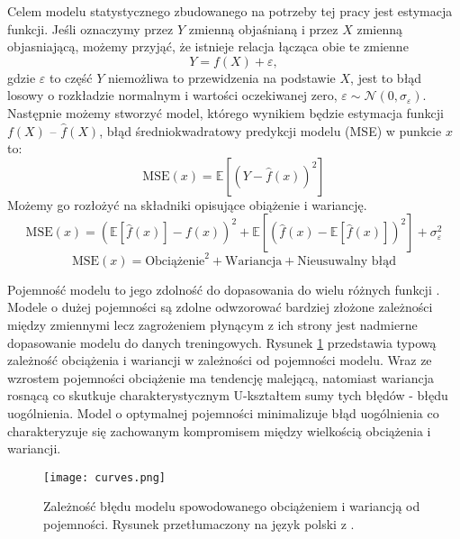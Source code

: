 \documentclass[11pt]{book}
\theoremstyle{definition}
\begin{document}
Celem modelu statystycznego zbudowanego na potrzeby tej pracy jest estymacja funkcji. Jeśli oznaczymy przez $Y$ zmienną objaśnianą i przez $X$ zmienną objasniającą, możemy przyjąć, że istnieje relacja łącząca obie te zmienne
%
\begin{equation}
 Y = f(X) + \varepsilon,
\end{equation}
%
gdzie $\varepsilon$ to część $Y$ niemożliwa to przewidzenia na podstawie $X$, jest to błąd losowy o rozkładzie normalnym i wartości oczekiwanej zero,  $\varepsilon \sim \mathcal{N}(0, \sigma_{\varepsilon})$. Następnie możemy stworzyć model, którego wynikiem będzie estymacja funkcji $f(X)$ -- $\hat{f}(X)$, błąd średniokwadratowy predykcji modelu (MSE) w punkcie $x$ to:
%
\begin{equation}
\text{MSE}(x) = \mathbb{E} \left[ \left(Y - \hat{f}(x)\right)^2  \right] 
\end{equation}
%
Możemy go rozłożyć na składniki opisujące obiążenie i wariancję.
%
\begin{equation}
\text{MSE}(x) =  \left(  \mathbb{E}\left[\hat{f}(x)\right] - f(x) \right)^2 +  \mathbb{E} \left[ \left(\hat{f}(x) - \mathbb{E}\left[ \hat{f}(x)\right]\right)^2  \right]  + \sigma^2_{\varepsilon}
\end{equation}
%
$$
\text{MSE}(x) = \text{Obciążenie}^2 + \text{Wariancja} + \text{Nieusuwalny błąd}
$$

Pojemność modelu to jego zdolność do dopasowania do wielu różnych funkcji \cite{Goodfellow-et-al-2016}. Modele o dużej pojemności są zdolne odwzorować bardziej złożone zależności między zmiennymi lecz zagrożeniem płynącym z ich strony jest nadmierne dopasowanie modelu do danych treningowych. Rysunek \ref{fig:pojemnosc} przedstawia typową zależność obciążenia i wariancji w zależności od pojemności modelu. Wraz ze wzrostem pojemności obciążenie ma tendencję malejącą, natomiast wariancja rosnącą co skutkuje charakterystycznym U-kształtem sumy tych błędów - błędu uogólnienia. Model o optymalnej pojemności minimalizuje błąd uogólnienia co charakteryzuje się zachowanym kompromisem między wielkością obciążenia i wariancji. 
%
\begin{figure}[h!]
	\centering
	\texttt{[image: curves.png]}
	\caption{Zależność błędu modelu spowodowanego obciążeniem i wariancją od pojemności. Rysunek przetłumaczony na język polski z \cite{Goodfellow-et-al-2016}.}
	\label{fig:pojemnosc}
\end{figure}
\end{document}
